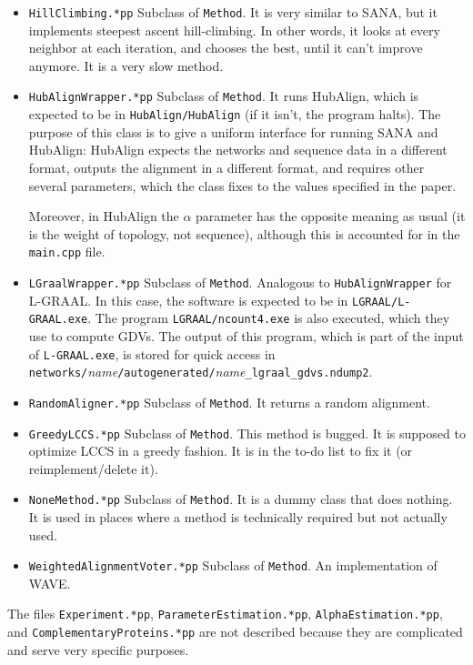 \documentclass[]{article}
\begin{document}
\begin{itemize}
\item \texttt{HillClimbing.*pp} Subclass of \texttt{Method}. It is very similar to SANA, but it implements steepest ascent hill-climbing. In other words, it looks at every neighbor at each iteration, and chooses the best, until it can't improve anymore. It is a very slow method.

\item \texttt{HubAlignWrapper.*pp} Subclass of \texttt{Method}. It runs HubAlign, which is expected to be in \texttt{HubAlign/HubAlign} (if it isn't, the program halts). The purpose of this class is to give a uniform interface for running SANA and HubAlign: HubAlign expects the networks and sequence data in a different format, outputs the alignment in a different format, and requires other several parameters, which the class fixes to the values specified in the paper.

Moreover, in HubAlign the $\alpha$ parameter has the opposite meaning as usual (it is the weight of topology, not sequence), although this is accounted for in the \texttt{main.cpp} file.

\item \texttt{LGraalWrapper.*pp} Subclass of \texttt{Method}. Analogous to \texttt{HubAlignWrapper} for L-GRAAL. In this case, the software is expected to be in \texttt{LGRAAL/L-GRAAL.exe}. The program \texttt{LGRAAL/ncount4.exe} is also executed, which they use to compute GDVs. The output of this program, which is part of the input of \texttt{L-GRAAL.exe}, is stored for quick access in\\ \texttt{networks/}\textit{name}\texttt{/autogenerated/}\textit{name}\texttt{\_lgraal\_gdvs.ndump2}.

\item \texttt{RandomAligner.*pp} Subclass of \texttt{Method}. It returns a random alignment.

\item \texttt{GreedyLCCS.*pp} Subclass of \texttt{Method}. This method is bugged. It is supposed to optimize LCCS in a greedy fashion. It is in the to-do list to fix it (or reimplement/delete it).

\item \texttt{NoneMethod.*pp} Subclass of \texttt{Method}. It is a dummy class that does nothing. It is used in places where a method is technically required but not actually used.

\item \texttt{WeightedAlignmentVoter.*pp} Subclass of \texttt{Method}. An implementation of WAVE.

\end{itemize}
The files \texttt{Experiment.*pp}, \texttt{ParameterEstimation.*pp}, \texttt{AlphaEstimation.*pp}, and \texttt{ComplementaryProteins.*pp} are not described because they are complicated and serve very specific purposes.
\end{document}

